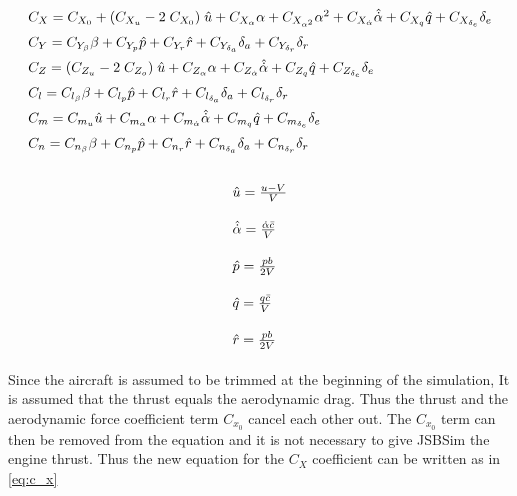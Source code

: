 \begin{equation}
\label{eq:body_coefs}
\arraycolsep=1.0pt\def\arraystretch{1.5}
\begin{array}{l}
{C_X} = C_{{X_0}} + ({C_{{X_u}}} - 2\;{C_{{X_0}}})\;\hat u + {C_{{X_\alpha }}}\alpha  + {C_{{X_{{\alpha ^2}}}}}{\alpha ^2} + C_{{X_{\dot{\alpha}}}}\hat{\dot{\alpha}}  + {C_{{X_q}}}\hat q + {C_{{X_{{\delta _e}}}}}{\delta _e}\\
{C_Y} = {C_{{Y_\beta }}}\beta  + {C_{{Y_p}}}\hat p + {C_{{Y_r}}}\hat r + {C_{{Y_{{\delta _a}}}}}{\delta _a} + {C_{{Y_{{\delta _r}}}}}{\delta _r}\\
{C_Z} = ({C_{{Z_u}}} - 2\;{C_{{Z_o}}})\;\hat u + {C_{{Z_\alpha }}}\alpha  + {C_{{Z_{\dot{\alpha}}}}\hat{\dot{\alpha}} + {C_{{Z_q}}}\hat q + C_{{Z_{{\delta _e}}}}}{\delta _e}\\
{C_l} = {C_{{l_\beta }}}\beta  + {C_{{l_p}}}\hat p + {C_{{l_r}}}\hat r + {C_{{l_{{\delta _a}}}}}{\delta _a} + {C_{{l_{{\delta _r}}}}}{\delta _r}\\
{C_m} = {C_{{m_u}}}\hat u + {C_{{m_\alpha }}}\alpha  + C_{{m_{\dot{\alpha}}}}\hat{\dot{\alpha}}  + {C_{{m_q}}}\hat q + {C_{{m_{{\delta _e}}}}}{\delta _e}\\
{C_n} = {C_{{n_\beta }}}\beta  + {C_{{n_p}}}\hat p + {C_{{n_r}}}\hat r + {C_{{n_{{\delta _a}}}}}{\delta _a} + {C_{{n_{{\delta _r}}}}}{\delta _r}
\end{array}
\end{equation}

\begin{equation}
\label{eq:dim_less_rates}
\arraycolsep=1.4pt\def\arraystretch{2.2}
\begin{array}{l}
\hat u = \frac{{u - V}}{V}\\
\hat{\dot{\alpha}} = \frac{\dot{\alpha}\bar{c}}{V}\\
\hat p = \frac{{pb}}{{2V}}\\
\hat q = \frac{{q\bar c}}{V}\\
\hat r = \frac{{pb}}{{2V}}
\end{array}
\end{equation}

Since the aircraft is assumed to be trimmed at the beginning of the simulation, It is assumed that the thrust equals the aerodynamic drag. Thus the thrust and the aerodynamic force coefficient term $C_{x_0}$ cancel each other out. The $C_{x_0}$ term can then be removed from the equation and it is not necessary to give JSBSim the engine thrust. Thus the new equation for the $C_X$ coefficient can be written as in \autoref{eq:c_x}

